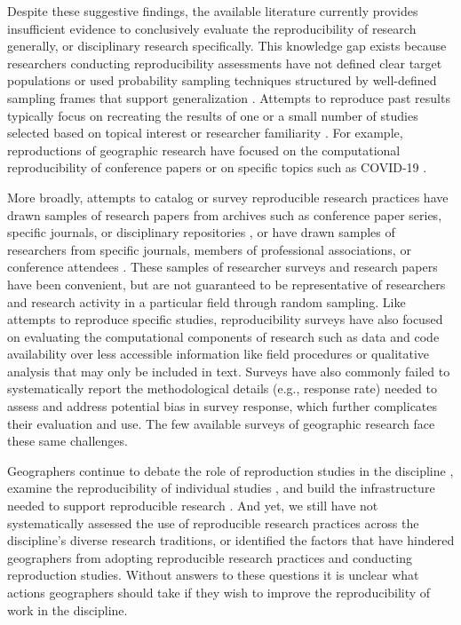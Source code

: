 \documentclass[]{interact}
\theoremstyle{plain}%
\theoremstyle{definition}
\theoremstyle{remark}
\begin{document}
Despite these suggestive findings, the available literature currently provides insufficient evidence to conclusively evaluate the reproducibility of research generally, or disciplinary research specifically.
This knowledge gap exists because researchers conducting reproducibility assessments have not defined clear target populations or used probability sampling techniques structured by well-defined sampling frames that support generalization \citep{NASEM2019}.
Attempts to reproduce past results typically focus on recreating the results of one or a small number of studies selected based on topical interest or researcher familiarity \citep{camerer2016evaluating, camerer2018evaluating, open2015estimating}. 
For example, reproductions of geographic research have focused on the computational reproducibility of conference papers \citep{Nust-AGILE_2018, Nust_AGILE_2022} or on specific topics such as COVID-19 \citep{Holler2023disability, kedron2021GA, paez2022reproducibility}. 

More broadly, attempts to catalog or survey reproducible research practices have drawn samples of research papers from archives such as conference paper series, specific journals, or disciplinary repositories \citep{byrne_2017, gundersen2018state, stodden2016enhancing, stodden2018enabling}, or have drawn samples of researchers from specific journals, members of professional associations, or conference attendees \citep{baker20161}.
These samples of researcher surveys and research papers have been convenient, but are not guaranteed to be representative of researchers and research activity in a particular field through random sampling. 
Like attempts to reproduce specific studies, reproducibility surveys have also focused on evaluating the computational components of research such as data and code availability over less accessible information like field procedures or qualitative analysis that may only be included in text.
Surveys have also commonly failed to systematically report the methodological details (e.g., response rate) needed to assess and address potential bias in survey response, which further complicates their evaluation and use. 
The few available surveys of geographic research \citep{balz2020reproducibility, konkol2019, ostermann2017} face these same challenges. 

Geographers continue to debate the role of reproduction studies in the discipline \citep{brunsdon2016, goodchild2021Annals, kedron2022replication, kedron2021IJGIS, singleton2016, sui2021, Wainwright2021}, examine the reproducibility of individual studies \citep{Nust_AGILE_2022, ostermann2021}, and build the infrastructure needed to support reproducible research \citep{nust2019, wilson2021, yin2019cybergis}. 
And yet, we still have not systematically assessed the use of reproducible research practices across the discipline's diverse research traditions, or identified the factors that have hindered geographers from adopting reproducible research practices and conducting reproduction studies. 
Without answers to these questions it is unclear what actions geographers should take if they wish to improve the reproducibility of work in the discipline.
\end{document}
